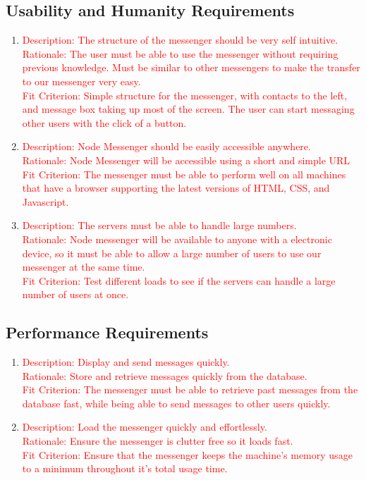 \documentclass[12pt, titlepage]{article}
\begin{document}
    	\subsection{Usability and Humanity Requirements}
    	\begin{enumerate}[label=NFR\arabic*:, resume, leftmargin=1in]
    	\item \textcolor{red}{Description: The structure of the messenger should be very self intuitive. \\
    		  Rationale: The user must be able to use the messenger without requiring previous knowledge. Must be similar to other messengers to make the transfer to our messenger very easy. \\
    		  Fit Criterion: Simple structure for the messenger, with contacts to the left, and message box taking up most of the screen. The user can start messaging other users with the click of a button.}
    	\item \textcolor{red}{Description: Node Messenger should be easily accessible anywhere. \\
    		  Rationale: Node Messenger will be accessible using a short and simple URL \\
    		  Fit Criterion: The messenger must be able to perform well on all machines that have a browser supporting the latest versions of HTML, CSS, and Javascript. }
    	\item \textcolor{red}{Description: The servers must be able to handle large numbers. \\
    		  Rationale: Node messenger will be available to anyone with a electronic device, so it must be able to allow a large number of users to use our messenger at the same time. \\
    		  Fit Criterion: Test different loads to see if the servers can handle a large number of users at once.}
    	\end{enumerate}
    	\subsection{Performance Requirements}
    	\begin{enumerate}[label=NFR\arabic*:, resume, leftmargin=1in]
    	\item \textcolor{red}{Description: Display and send messages quickly. \\
    		  Rationale: Store and retrieve messages quickly from the database. \\
    		  Fit Criterion: The messenger must be able to retrieve past messages from the database fast, while being able to send messages to other users quickly.} 
    	\item \textcolor{red}{Description: Load the messenger quickly and effortlessly. \\
    		  Rationale: Ensure the messenger is clutter free so it loads fast. \\
    		  Fit Criterion: Ensure that the messenger keeps the machine's memory usage to a minimum throughout it's total usage time. }
    	\end{enumerate}
\end{document}
